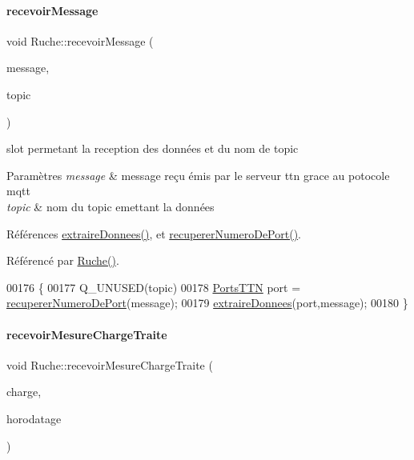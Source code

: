 \paragraph{\texorpdfstring{recevoir\+Message}{recevoirMessage}}
{\footnotesize\ttfamily void Ruche\+::recevoir\+Message (\begin{DoxyParamCaption}\item[{const Q\+Byte\+Array \&}]{message,  }\item[{const Q\+Mqtt\+Topic\+Name \&}]{topic }\end{DoxyParamCaption})\hspace{0.3cm}{\ttfamily [slot]}}

slot permetant la reception des données et du nom de topic 
\begin{DoxyParams}{Paramètres}
{\em message} & message reçu émis par le serveur ttn grace au potocole mqtt \\
\hline
{\em topic} & nom du topic emettant la données \\
\hline
\end{DoxyParams}


Références \hyperlink{class_ruche_a21c0dafeaec03d451590037343e6a3ca}{extraire\+Donnees()}, et \hyperlink{class_ruche_a157782119650e2bd196612c3fa66972c}{recuperer\+Numero\+De\+Port()}.



Référencé par \hyperlink{class_ruche_a8b4ee3752d984c5acee93b990db7939a}{Ruche()}.


\begin{DoxyCode}
00176 \{   
00177     Q\_UNUSED(topic)
00178     \hyperlink{parametres_8h_a0fe68caa1e9147addc96657cc822b937}{PortsTTN} port = \hyperlink{class_ruche_a157782119650e2bd196612c3fa66972c}{recupererNumeroDePort}(message);
00179     \hyperlink{class_ruche_a21c0dafeaec03d451590037343e6a3ca}{extraireDonnees}(port,message);
00180 \}
\end{DoxyCode}
\mbox{\label{class_ruche_a4ad540139115b79cd52336ad1a11453c}} 
\paragraph{\texorpdfstring{recevoir\+Mesure\+Charge\+Traite}{recevoirMesureChargeTraite}}
{\footnotesize\ttfamily void Ruche\+::recevoir\+Mesure\+Charge\+Traite (\begin{DoxyParamCaption}\item[{double}]{charge,  }\item[{Q\+String}]{horodatage }\end{DoxyParamCaption})\hspace{0.3cm}{\ttfamily [slot]}}



